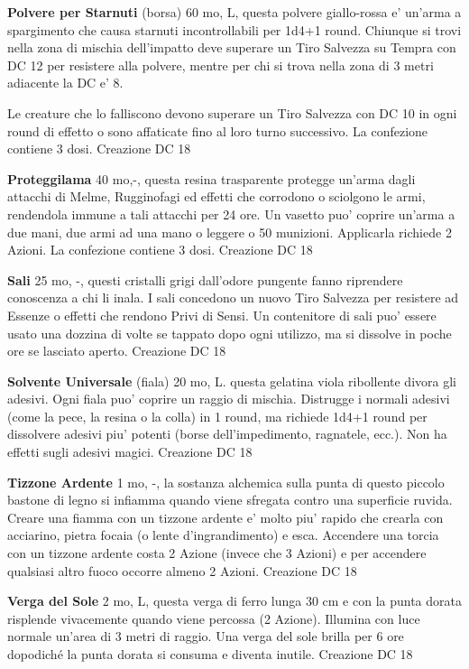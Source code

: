\documentclass[a4paper,11pt,twoside,openany]{book}
\begin{document}
{\textbf{Polvere per Starnuti} (borsa) 60 mo, L, questa polvere giallo-rossa e' un'arma a spargimento che causa starnuti incontrollabili per 1d4+1 round. Chiunque si trovi nella zona di mischia dell'impatto deve superare un Tiro Salvezza su Tempra con DC 12 per resistere alla polvere, mentre per chi si trova nella zona di 3 metri adiacente la DC e' 8.

Le creature che lo falliscono devono superare un Tiro Salvezza con DC 10 in ogni round di effetto o sono affaticate fino al loro turno successivo. La confezione contiene 3 dosi. Creazione DC 18

\textbf{Proteggilama} 40 mo,-, questa resina trasparente protegge un'arma dagli attacchi di Melme, Rugginofagi ed effetti che corrodono o sciolgono le armi, rendendola immune a tali attacchi per 24 ore. Un vasetto puo' coprire un'arma a due mani, due armi ad una mano o leggere o 50 munizioni. Applicarla richiede 2 Azioni. La confezione contiene 3 dosi. Creazione DC 18

\textbf{Sali} 25 mo, -,  questi cristalli grigi dall'odore pungente fanno riprendere conoscenza a chi li inala. I sali concedono un nuovo Tiro Salvezza per resistere ad Essenze o effetti che rendono Privi di Sensi.
Un contenitore di sali puo' essere usato una dozzina di volte se tappato dopo ogni utilizzo, ma si dissolve in poche ore se lasciato aperto. Creazione DC 18

\textbf{Solvente Universale} (fiala) 20 mo, L. questa gelatina viola ribollente divora gli adesivi. Ogni fiala puo' coprire un raggio di mischia. Distrugge i normali adesivi (come la pece, la resina o la colla) in 1 round, ma richiede 1d4+1 round per dissolvere adesivi piu' potenti (borse dell'impedimento, ragnatele, ecc.). Non ha effetti sugli adesivi magici. Creazione DC 18

\textbf{Tizzone Ardente} 1 mo, -, la sostanza alchemica sulla punta di questo piccolo bastone di legno si infiamma quando viene sfregata contro una superficie ruvida. Creare una fiamma con un tizzone ardente e' molto piu' rapido che crearla con acciarino, pietra focaia (o lente d'ingrandimento) e esca. Accendere una torcia con un tizzone ardente costa 2 Azione (invece che 3 Azioni) e per accendere qualsiasi altro fuoco occorre almeno 2 Azioni. Creazione DC 18

\textbf{Verga del Sole} 2 mo, L, questa verga di ferro lunga 30 cm e con la punta dorata risplende vivacemente quando viene percossa (2 Azione). Illumina con luce normale un'area di 3 metri di raggio. Una verga del sole brilla per 6 ore dopodiché la punta dorata si consuma e diventa inutile. Creazione DC 18

}
\end{document}
